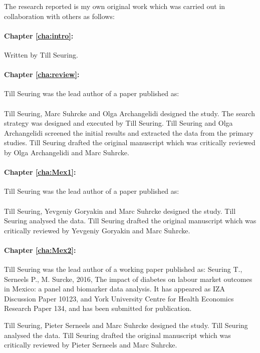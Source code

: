 The research reported is my own original work which was carried out in collaboration with
others as follows:

\paragraph{Chapter \ref{cha:intro}:} Written by Till Seuring. 

\paragraph{Chapter \ref{cha:review}:} Till Seuring was the lead author of a paper published as:
\\[12pt]
\noindent{}
\\[12pt]
\noindent Till Seuring, Marc Suhrcke and Olga Archangelidi designed the study. The search strategy was designed and executed by Till Seuring. Till Seuring and Olga Archangelidi screened the initial results and extracted the data from the primary studies. Till Seuring drafted the original manuscript which was critically reviewed by Olga Archangelidi and Marc Suhrcke.

\paragraph{Chapter \ref{cha:Mex1}:} Till Seuring was the lead author of a paper published as:
\\[12pt]
\noindent{}
\\[12pt]
\noindent Till Seuring, Yevgeniy Goryakin and Marc Suhrcke  designed the study. Till Seuring analysed the data. Till Seuring drafted the original manuscript which was critically reviewed by Yevgeniy Goryakin and Marc Suhrcke.


\paragraph{Chapter \ref{cha:Mex2}:} Till Seuring was the lead author of a working paper published as: 
Seuring T., Serneels P., M. Surcke, 2016, The impact of diabetes on labour market outcomes in Mexico: a panel and biomarker data analysis. It has appeared as IZA Discussion Paper 10123, and York University Centre for Health Economics Research Paper 134, and has been submitted for publication.

Till Seuring, Pieter Serneels and Marc Suhrcke designed the study. Till Seuring analysed the data. Till Seuring drafted the original manuscript which was critically reviewed by Pieter Serneels and Marc Suhrcke.



